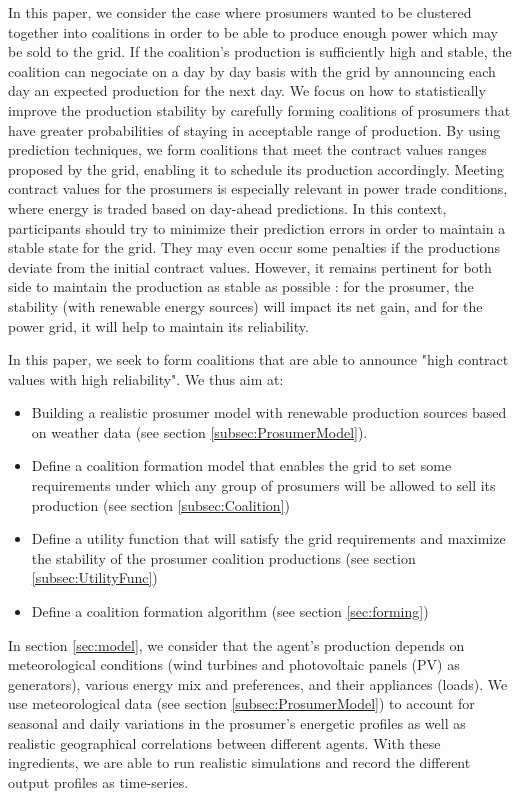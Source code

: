 \documentclass[conference]{IEEEtran}
\begin{document}
In this paper, we consider the case where prosumers wanted to be clustered together into coalitions in order to be able to produce enough power which may be sold to the grid. If the coalition's production is sufficiently high and stable, the coalition can negociate on a day by day basis with the grid by announcing each day an expected production for the next day. We focus on how to statistically improve the production stability by carefully forming coalitions of prosumers that have greater probabilities of staying in acceptable range of production. By using prediction techniques, we form coalitions that meet the contract values ranges proposed by the grid, enabling it to schedule its production accordingly. Meeting contract values for the prosumers is especially relevant in power trade conditions, where energy is traded based on day-ahead predictions. In this context, participants should try to minimize their prediction errors in order to maintain a stable state for the grid. They may even occur some penalties if the productions deviate from the initial contract values. However, it remains pertinent for both side to maintain the production as stable as possible : for the prosumer, the stability (with renewable energy sources) will impact its net gain, and for the power grid, it will help to maintain its reliability.

In this paper, we seek to form coalitions that are able to announce "high contract values with high reliability". We thus aim at:
\begin{itemize}
\item Building a realistic prosumer model with renewable production sources based on weather data (see section \ref{subsec:ProsumerModel}).
\item Define a coalition formation model that enables the grid to set some requirements under which any group of prosumers will be allowed to sell its production (see section \ref{subsec:Coalition})
\item Define a utility function that will satisfy the grid requirements and maximize the stability of the prosumer coalition productions (see section \ref{subsec:UtilityFunc})
\item Define a coalition formation algorithm (see section \ref{sec:forming})
\end{itemize}

In section \ref{sec:model}, we consider that the agent's production depends on meteorological conditions (wind turbines and photovoltaic panels (PV) as generators), various energy mix and preferences, and their appliances (loads). We use meteorological data (see section \ref{subsec:ProsumerModel}) to account for seasonal and daily variations in the prosumer's energetic profiles as well as realistic geographical correlations between different agents. With these ingredients, we are able to run realistic simulations and record the different output profiles as time-series.
\end{document}
